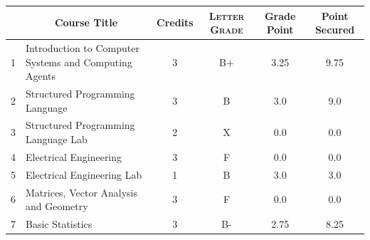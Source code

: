 \documentclass[11pt]{article}
\newcommand*{\numtwo}[1]{\pgfmathprintnumber[
                    fixed, precision=2, fixed zerofill=true]{#1}}
\begin{document}
                \begin{center}
                    \renewcommand{\arraystretch}{1.08}
                    
                \begin{tabular}{|c|l|c|>{\scshape}c|c|c|}
                \hline  \rule[-1ex]{0pt}{3.5ex} {\centering{\bf Course Code}} &  \multicolumn{1}{c|}{\textbf{Course Title}}  & {\bf Credits} & {\bf Letter Grade} & {\bf Grade Point} & {\bf Point Secured}  \\ 
                \hline   1 &  Introduction to Computer Systems and Computing Agents		 & 3 & B+ & 3.25 & 9.75 \\ %
                \hline   2 &  Structured Programming Language		 & 3 & B & 3.0 & 9.0 \\ %
                \hline   3 &  Structured Programming Language Lab		 & 2 & X & 0.0 & 0.0 \\ %
                \hline   4 &  Electrical Engineering		 & 3 & F & 0.0 & 0.0 \\ %
                \hline   5 &  Electrical Engineering Lab		 & 1 & B & 3.0 & 3.0 \\ %
                \hline   6 &  Matrices, Vector Analysis and Geometry		 & 3 & F & 0.0 & 0.0 \\ %
                \hline   7 &  Basic Statistics		 & 3 & B- & 2.75 & 8.25 \\ %

\hline                %
                \end{tabular}
                \end{center}
                \renewcommand{\arraystretch}{1.03}
\end{document}
